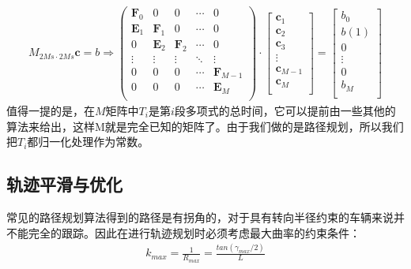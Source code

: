 \documentclass[master,academic]{ysuthesis} %
\begin{document}
			\begin{equation}
				\begin{aligned}
					M_{2Ms\cdot2Ms}\mathbf{c}=b\Longrightarrow ( \begin{matrix}
						\mathbf{F}_0&		0&		0&		\cdots&		0\\
						\mathbf{E}_1&		\mathbf{F}_1&		0&		\cdots&		0\\
						0&		\mathbf{E}_2&		\mathbf{F}_2&		\cdots&		0\\
						\vdots&		\vdots&		\vdots&		\ddots&		\vdots\\
						0&		0&		0&		\cdots&		\mathbf{F}_{M-1}\\
						0&		0&		0&		\cdots&		\mathbf{E}_M\\
					\end{matrix} ) \cdot \left[ \begin{array}{c}
						\mathbf{c}_1\\
						\mathbf{c}_2\\
						\mathbf{c}_3\\
						\vdots\\
						\mathbf{c}_{M-1}\\
						\mathbf{c}_M\\
					\end{array} \right] =\left[ \begin{array}{c}
						b_0\\
						b( 1 )\\
						0\\
						\vdots\\
						0\\
						b_M\\
					\end{array} \right] 
				\end{aligned}
			\end{equation}
			值得一提的是，在$M$矩阵中$T_i$是第$i$段多项式的总时间，它可以提前由一些其他的算法来给出，这样M就是完全已知的矩阵了。由于我们做的是路径规划，所以我们把$T_i$都归一化处理作为常数。
			
		\subsection{轨迹平滑与优化}
		常见的路径规划算法得到的路径是有拐角的，对于具有转向半径约束的车辆来说并不能完全的跟踪。因此在进行轨迹规划时必须考虑最大曲率的约束条件：
		\begin{equation}
			\begin{aligned}
				k_{max}=\frac{1}{R_{max}}=\frac{tan( \gamma _{max}/2 )}{L}
			\end{aligned}
		\end{equation}
	
\end{document}
